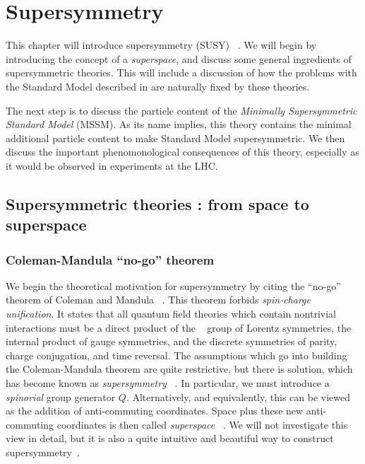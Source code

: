 

\chapter[Supersymmetry][Top of Page Title]{Supersymmetry}\label{ch:susy}

This chapter will introduce supersymmetry (SUSY) ~\cite{Miyazawa:1966mfa, Gervais:1971xj, Gervais:1971ji, Golfand:1971iw, Neveu:1971rx, Neveu:1971iv, Volkov:1973ix,  Wess:1973kz, Salam:1974ig, Ferrara:1974ac, Wess:1974tw, susyPrimer,Lykken:1996xt, archilSUSYLectures}.
We will begin by introducing the concept of a \textit{superspace}, and discuss some general ingredients of supersymmetric theories.
This will include a discussion of how the problems with the Standard Model described in  are naturally fixed by these theories.

The next step is to discuss the particle content of the \textit{Minimally Supersymmetric Standard Model} (MSSM).
As its name implies, this theory contains the minimal additional particle content to make Standard Model supersymmetric.
We then discuss the important phenomonological consequences of this theory, especially as it would be observed in experiments at the LHC.

\section{Supersymmetric theories : from space to superspace}

\subsection{Coleman-Mandula ``no-go'' theorem}

We begin the theoretical motivation for supersymmetry by citing the ``no-go'' theorem of Coleman and Mandula ~\cite{Coleman:1967ad}.
This theorem forbids \textit{spin-charge unification}.
It states that all quantum field theories which contain nontrivial interactions must be a direct product of the \Poincare~ group of Lorentz symmetries, the internal product of gauge symmetries, and the discrete symmetries of parity, charge conjugation, and time reversal.
The assumptions which go into building the Coleman-Mandula theorem are quite restrictive, but there is solution, which has become known as \textit{supersymmetry} ~\cite{Golfand:1971iw, Haag:1974qh}.
In particular, we must introduce a \textit{spinorial} group generator $Q$.
Alternatively, and equivalently, this can be viewed as the addition of anti-commuting coordinates.
Space plus these new anti-commuting coordinates is then called \textit{superspace} ~\cite{Salam:1974jj}.
We will not investigate this view in detail, but it is also a quite intuitive and beautiful way to construct supersymmetry~\cite{susyPrimer}.

